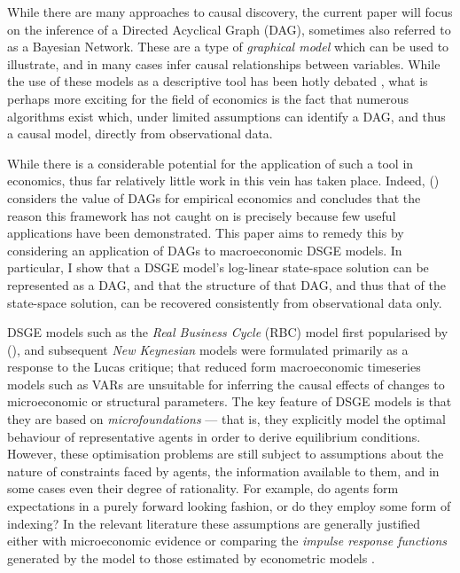 \documentclass{article}
\begin{document}
While there are many approaches to causal discovery, the current paper will focus on the inference of a Directed Acyclical Graph (DAG), sometimes also referred to as a Bayesian Network. These are a type of \textit{graphical model} which can be used to illustrate, and in many cases infer causal relationships between variables. While the use of these models as a descriptive tool has been hotly debated \parencite{pearl2018book}, what is perhaps more exciting for the field of economics is the fact that numerous algorithms exist which, under limited assumptions can identify a DAG, and thus a causal model, directly from observational data.

While there is a considerable potential for the application of such a tool in economics, thus far relatively little work in this vein has taken place. Indeed, \citeauthor{imbens2019potential} (\citeyear{imbens2019potential}) considers the value of DAGs for empirical economics and concludes that the reason this framework has not caught on is precisely because few useful applications have been demonstrated. This paper aims to remedy this by considering an application of DAGs to macroeconomic DSGE models. In particular, I show that a DSGE model's log-linear state-space solution can be represented as a DAG, and that the structure of that DAG, and thus that of the state-space solution, can be recovered consistently from observational data only. 

DSGE models such as the \textit{Real Business Cycle} (RBC) model first popularised by \citeauthor{kydland1982time} (\citeyear{kydland1982time}), and subsequent \textit{New Keynesian} models were formulated primarily as a response to the Lucas critique; that reduced form macroeconomic timeseries models such as VARs are unsuitable for inferring the causal effects of changes to microeconomic or structural parameters. The key feature of DSGE models is that they are based on \textit{microfoundations} --- that is, they explicitly model the optimal behaviour of representative agents in order to derive equilibrium conditions. However, these optimisation problems are still subject to assumptions about the nature of constraints faced by agents, the information available to them, and in some cases even their degree of rationality. For example, do agents form expectations in a purely forward looking fashion, or do they employ some form of indexing? In the relevant literature these assumptions are generally justified either with microeconomic evidence or comparing the \textit{impulse response functions} generated by the model to those estimated by econometric models \parencite{christiano2018on}. 
\end{document}
